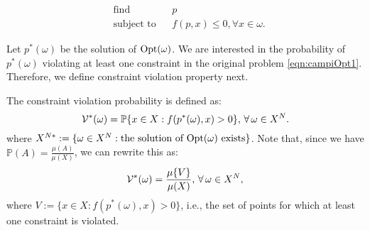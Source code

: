 \begin{equation}
\label{eqn:campiOpt2}
\begin{aligned}
& \text{find} & & p \\
& \text{subject to} 
& & f(p, x) \leq 0, \forall x \in \omega. \end{aligned}
\end{equation}

Let $p^*(\omega)$ be the solution of $\text{Opt}(\omega)$. We are interested in the probability of $p^*(\omega)$ violating at least one constraint in the original problem \eqref{eqn:campiOpt1}. Therefore, we define constraint violation property next.

\begin{definition} The constraint violation probability is defined as:
\begin{equation*}
\mathcal{V}^*(\omega)=
      \mathbb{P}\{x \in X: f(p^*(\omega), x) > 0\},\, \forall\, \omega \in X^N.
\end{equation*}
where $X^{N*}:=\{\omega \in X^N: \text{the solution of $\text{Opt}(\omega)$ exists}\}$. 
Note that, since we have $\mathbb{P}(A) = \frac{\mu(A)}{\mu(X)}$, we can rewrite this as:
\begin{equation*}
\mathcal{V}^*(\omega)=
      \frac{\mu\{V\}}{\mu(X)},\, \forall\, \omega \in X^N,
\end{equation*}
where $V:=\{x \in X: f(p^*(\omega),x) > 0\}$, i.e., the set of points for which at least one constraint is violated.
\end{definition}


